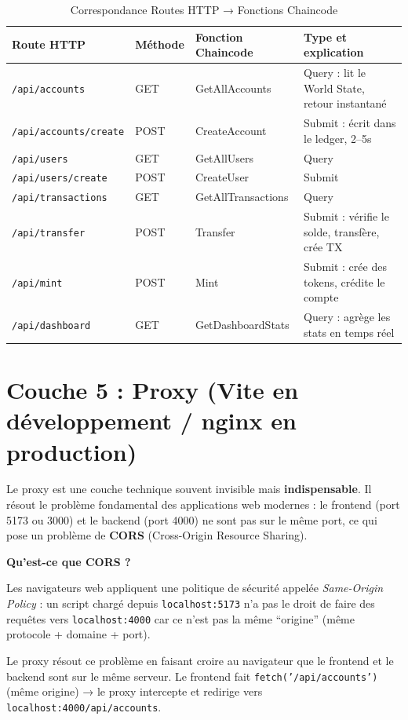 \documentclass[12pt,a4paper,twoside]{report}
\begin{document}
\begin{table}[H]
\centering
\begin{tabularx}{\textwidth}{lllX}
\toprule
\textbf{Route HTTP} & \textbf{Méthode} & \textbf{Fonction Chaincode} & \textbf{Type et explication} \\
\midrule
\texttt{/api/accounts} & GET & GetAllAccounts & Query : lit le World State, retour instantané \\
\texttt{/api/accounts/create} & POST & CreateAccount & Submit : écrit dans le ledger, 2--5s \\
\texttt{/api/users} & GET & GetAllUsers & Query \\
\texttt{/api/users/create} & POST & CreateUser & Submit \\
\texttt{/api/transactions} & GET & GetAllTransactions & Query \\
\texttt{/api/transfer} & POST & Transfer & Submit : vérifie le solde, transfère, crée TX \\
\texttt{/api/mint} & POST & Mint & Submit : crée des tokens, crédite le compte \\
\texttt{/api/dashboard} & GET & GetDashboardStats & Query : agrège les stats en temps réel \\
\bottomrule
\end{tabularx}
\caption{Correspondance Routes HTTP → Fonctions Chaincode}
\end{table}

\section{Couche 5 : Proxy (Vite en développement / nginx en production)}

Le proxy est une couche technique souvent invisible mais \textbf{indispensable}. Il résout le problème fondamental des applications web modernes : le frontend (port 5173 ou 3000) et le backend (port 4000) ne sont pas sur le même port, ce qui pose un problème de \textbf{CORS} (Cross-Origin Resource Sharing).

\begin{infobox}
\textbf{Qu'est-ce que CORS ?}

Les navigateurs web appliquent une politique de sécurité appelée \textit{Same-Origin Policy} : un script chargé depuis \texttt{localhost:5173} n'a pas le droit de faire des requêtes vers \texttt{localhost:4000} car ce n'est pas la même ``origine'' (même protocole + domaine + port).

Le proxy résout ce problème en faisant croire au navigateur que le frontend et le backend sont sur le même serveur. Le frontend fait \texttt{fetch('/api/accounts')} (même origine) → le proxy intercepte et redirige vers \texttt{localhost:4000/api/accounts}.
\end{infobox}
\end{document}
